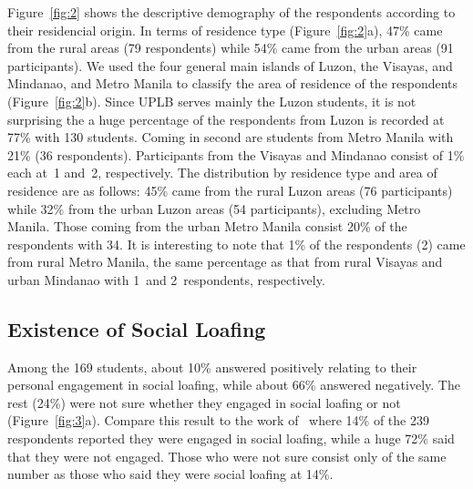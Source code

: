 \documentclass[a4paper,a4paper,BCOR12mm,12pt,abstracton,pointednumbers,tablecaptionabove,footinclude,halfparskip,normalheadings,]{scrartcl}
\begin{document}
\begin{figure*}[hbt]
\centering{}
\caption{The descriptive demographic distribution of the respondents according to personal data: (a)~By gender, (b)~by age group, (c)~by gender $\times$ age group, (d)~by class, and (e)~by gender $\times$ class.}\label{fig:1}
\end{figure*}

Figure~\ref{fig:2} shows the descriptive demography of the respondents according to their residencial origin. In terms of residence type (Figure~\ref{fig:2}a), 47\% came from the rural areas (79 respondents) while 54\% came from the urban areas (91 participants). We used the four general main islands of Luzon, the Visayas, and Mindanao, and Metro Manila to classify the area of residence of the respondents (Figure~\ref{fig:2}b). Since UPLB serves mainly the Luzon students, it is not surprising the a huge percentage of the respondents from Luzon is recorded at 77\% with 130 students. Coming in second are students from Metro Manila with 21\% (36 respondents). Participants from the Visayas and Mindanao consist of 1\% each at~1 and~2, respectively. The distribution by residence type and area of residence are as follows: 45\% came from the rural Luzon areas (76 participants) while 32\% from the urban Luzon areas (54 participants), excluding Metro Manila. Those coming from the urban Metro Manila consist 20\% of the respondents with 34. It is interesting to note that 1\% of the respondents (2) came from rural Metro Manila, the same percentage as that from rural Visayas and urban Mindanao with 1~and 2~respondents, respectively.

\begin{figure*}[hbt]
\centering{}
\caption{The descriptive demographic distribution of the respondents according to place of residence data: (a)~By residence type, (b)~by area of origin, and (c)~by residence type $\times$ area of origin.}\label{fig:2}
\end{figure*}

\subsection{Existence of Social Loafing}

Among the 169 students, about 10\% answered positively relating to their personal engagement in social loafing, while about 66\% answered negatively. The rest (24\%) were not sure whether they engaged in social loafing or not (Figure~\ref{fig:3}a). Compare this result to the work of~\citet{Pabico08} where 14\% of the 239 respondents reported they were engaged in social loafing, while a huge 72\% said that they were not engaged. Those who were not sure consist only of the same number as those who said they were social loafing at 14\%. 
\end{document}
